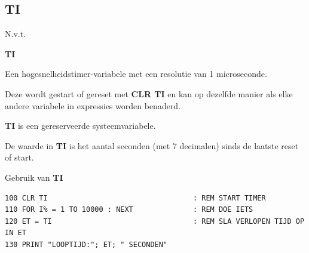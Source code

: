 
\newpage
\subsection{TI}
\begin{description}[leftmargin=2cm,style=nextline]
\item [Token:]    N.v.t.

\item [Formaat:]   {\bf TI}

\item [Gebruik:]    Een hogesnelheidstimer-variabele met een resolutie van 1 microseconde.

                  Deze wordt gestart of gereset met {\bf CLR TI} en kan op dezelfde manier als elke andere variabele in expressies worden benaderd.

\item [Opmerkingen:]  {\bf TI} is een gereserveerde systeemvariabele.

                  De waarde in {\bf TI} is het aantal seconden (met 7 decimalen) sinds de laatste reset of start.

\item [Voorbeeld:]  Gebruik van {\bf TI}

\begin{tcolorbox}[colback=black,coltext=white]
\verbatimfont{\codefont}
\begin{verbatim}
100 CLR TI                                  : REM START TIMER
110 FOR I% = 1 TO 10000 : NEXT              : REM DOE IETS
120 ET = TI                                 : REM SLA VERLOPEN TIJD OP IN ET
130 PRINT "LOOPTIJD:"; ET; " SECONDEN"
\end{verbatim}
\end{tcolorbox}
\end{description}


\newpage
